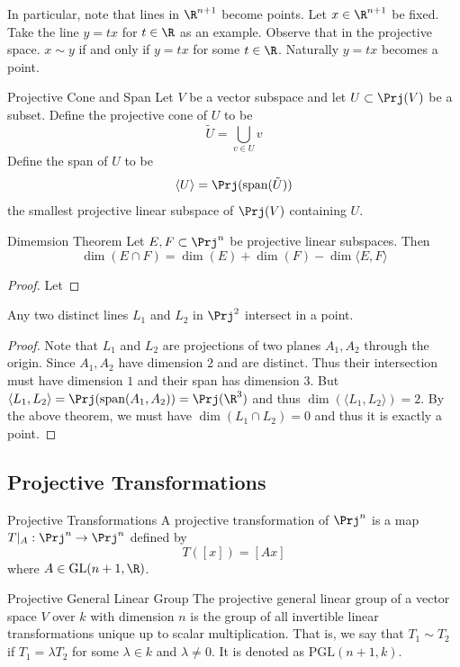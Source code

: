 \documentclass[a4paper]{article}
\begin{document}
In particular, note that lines in $\R^{n+1}$ become points. Let $x\in\R^{n+1}$ be fixed. Take the line $y=tx$ for $t\in\R$ as an example. Observe that in the projective space. $x\sim y$ if and only if $y=tx$ for some $t\in\R$. Naturally $y=tx$ becomes a point. 

\begin{defn}{Projective Cone and Span}{} Let $V$ be a vector subspace and let $U\subset\Prj(V)$ be a subset. Define the projective cone of $U$ to be $$\tilde{U}=\bigcup_{v\in U}v$$ Define the span of $U$ to be $$\langle U\rangle=\Prj(\text{span}(\tilde{U}))$$ the smallest projective linear subspace of $\Prj(V)$ containing $U$. 
\end{defn}

\begin{thm}{Dimemsion Theorem}{} Let $E,F\subset\Prj^n$ be projective linear subspaces. Then $$\dim(E\cap F)=\dim(E)+\dim(F)-\dim\langle E,F\rangle$$ 
\begin{proof}
Let 
\end{proof}
\end{thm}

\begin{thm}{}{} Any two distinct lines $L_1$ and $L_2$ in $\Prj^2$ intersect in a point. 
\begin{proof}
Note that $L_1$ and $L_2$ are projections of two planes $A_1,A_2$ through the origin. Since $A_1,A_2$ have dimension $2$ and are distinct. Thus their intersection must have dimension $1$ and their span has dimension $3$. But $\langle L_1,L_2\rangle=\Prj(\text{span}(A_1,A_2))=\Prj(\R^3)$ and thus $\dim(\langle L_1,L_2\rangle)=2$. By the above theorem, we must have $\dim(L_1\cap L_2)=0$ and thus it is exactly a point. 
\end{proof}
\end{thm}

\subsection{Projective Transformations}
\begin{defn}{Projective Transformations}{} A projective transformation of $\Prj^n$ is a map $T|_A:\Prj^n\to\Prj^n$ defined by $$T([x])=[Ax]$$ where $A\in\text{GL}(n+1,\R)$. 
\end{defn}

\begin{defn}{Projective General Linear Group}{} The projective general linear group of a vector space $V$ over $k$ with dimension $n$ is the group of all invertible linear transformations unique up to scalar multiplication. That is, we say that $T_1\sim T_2$ if $T_1=\lambda T_2$ for some $\lambda\in k$ and $\lambda\neq0$. It is denoted as $\text{PGL}(n+1,k)$. 
\end{defn}
\end{document}
